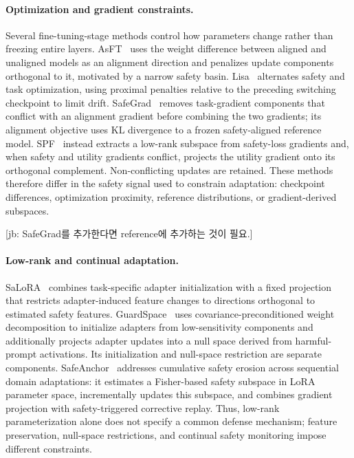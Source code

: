 \documentclass{article}
\newcommand{\wjb}[1]{{\leavevmode\color{orange}[jb: #1]}}
\begin{document}
\paragraph{Optimization and gradient constraints.} Several fine-tuning-stage methods control how parameters change rather than freezing entire layers. AsFT~\citep{asft} uses the weight difference between aligned and unaligned models as an alignment direction and penalizes update components orthogonal to it, motivated by a narrow safety basin. Lisa~\citep{lisa} alternates safety and task optimization, using proximal penalties relative to the preceding switching checkpoint to limit drift. SafeGrad~\citep{safegrad} removes task-gradient components that conflict with an alignment gradient before combining the two gradients; its alignment objective uses KL divergence to a frozen safety-aligned reference model. SPF~\citep{zhang2026understanding} instead extracts a low-rank subspace from safety-loss gradients and, when safety and utility gradients conflict, projects the utility gradient onto its orthogonal complement. Non-conflicting updates are retained. These methods therefore differ in the safety signal used to constrain adaptation: checkpoint differences, optimization proximity, reference distributions, or gradient-derived subspaces.

\wjb{SafeGrad를 추가한다면 reference에 추가하는 것이 필요.}

\paragraph{Low-rank and continual adaptation.} SaLoRA~\citep{salora} combines task-specific adapter initialization with a fixed projection that restricts adapter-induced feature changes to directions orthogonal to estimated safety features. GuardSpace~\citep{zhang2026guardrail} uses covariance-preconditioned weight decomposition to initialize adapters from low-sensitivity components and additionally projects adapter updates into a null space derived from harmful-prompt activations. Its initialization and null-space restriction are separate components. SafeAnchor~\citep{guo2026safeanchor} addresses cumulative safety erosion across sequential domain adaptations: it estimates a Fisher-based safety subspace in LoRA parameter space, incrementally updates this subspace, and combines gradient projection with safety-triggered corrective replay. Thus, low-rank parameterization alone does not specify a common defense mechanism; feature preservation, null-space restrictions, and continual safety monitoring impose different constraints.
\end{document}
